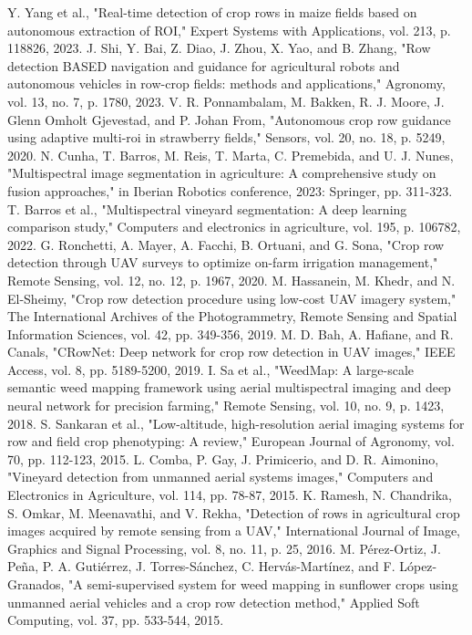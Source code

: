\documentclass[conference]{IEEEtran}
\begin{document}
\begin{thebibliography}{00}
 Y. Yang et al., "Real-time detection of crop rows in maize fields based on autonomous extraction of ROI," Expert Systems with Applications, vol. 213, p. 118826, 2023.
 J. Shi, Y. Bai, Z. Diao, J. Zhou, X. Yao, and B. Zhang, "Row detection BASED navigation and guidance for agricultural robots and autonomous vehicles in row-crop fields: methods and applications," Agronomy, vol. 13, no. 7, p. 1780, 2023.
 V. R. Ponnambalam, M. Bakken, R. J. Moore, J. Glenn Omholt Gjevestad, and P. Johan From, "Autonomous crop row guidance using adaptive multi-roi in strawberry fields," Sensors, vol. 20, no. 18, p. 5249, 2020.
 N. Cunha, T. Barros, M. Reis, T. Marta, C. Premebida, and U. J. Nunes, "Multispectral image segmentation in agriculture: A comprehensive study on fusion approaches," in Iberian Robotics conference, 2023: Springer, pp. 311-323. 
 T. Barros et al., "Multispectral vineyard segmentation: A deep learning comparison study," Computers and electronics in agriculture, vol. 195, p. 106782, 2022.
 G. Ronchetti, A. Mayer, A. Facchi, B. Ortuani, and G. Sona, "Crop row detection through UAV surveys to optimize on-farm irrigation management," Remote Sensing, vol. 12, no. 12, p. 1967, 2020.
 M. Hassanein, M. Khedr, and N. El-Sheimy, "Crop row detection procedure using low-cost UAV imagery system," The International Archives of the Photogrammetry, Remote Sensing and Spatial Information Sciences, vol. 42, pp. 349-356, 2019.
 M. D. Bah, A. Hafiane, and R. Canals, "CRowNet: Deep network for crop row detection in UAV images," IEEE Access, vol. 8, pp. 5189-5200, 2019.
 I. Sa et al., "WeedMap: A large-scale semantic weed mapping framework using aerial multispectral imaging and deep neural network for precision farming," Remote Sensing, vol. 10, no. 9, p. 1423, 2018.
 S. Sankaran et al., "Low-altitude, high-resolution aerial imaging systems for row and field crop phenotyping: A review," European Journal of Agronomy, vol. 70, pp. 112-123, 2015.
 L. Comba, P. Gay, J. Primicerio, and D. R. Aimonino, "Vineyard detection from unmanned aerial systems images," Computers and Electronics in Agriculture, vol. 114, pp. 78-87, 2015.
 K. Ramesh, N. Chandrika, S. Omkar, M. Meenavathi, and V. Rekha, "Detection of rows in agricultural crop images acquired by remote sensing from a UAV," International Journal of Image, Graphics and Signal Processing, vol. 8, no. 11, p. 25, 2016.
 M. Pérez-Ortiz, J. Peña, P. A. Gutiérrez, J. Torres-Sánchez, C. Hervás-Martínez, and F. López-Granados, "A semi-supervised system for weed mapping in sunflower crops using unmanned aerial vehicles and a crop row detection method," Applied Soft Computing, vol. 37, pp. 533-544, 2015.

\end{thebibliography}
\end{document}
